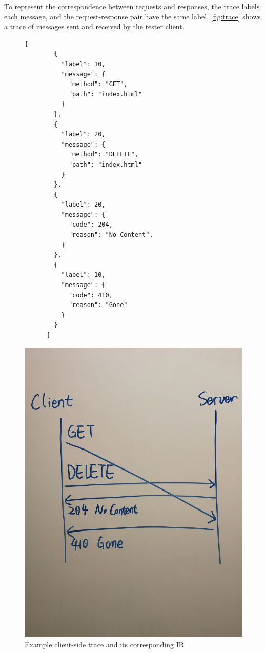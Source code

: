 To represent the correspondence between requests and responses, the trace labels
each message, and the request-response pair have the same label.
\autoref{fig:trace} shows a trace of messages sent and received by the tester
client.

\begin{figure}
  \begin{minipage}{.5\textwidth}
    \begin{lstlisting}[style=json]
      [
        {
          "label": 10,
          "message": {
            "method": "GET",
            "path": "index.html"
          }
        },
        {
          "label": 20,
          "message": {
            "method": "DELETE",
            "path": "index.html"
          }
        },
        {
          "label": 20,
          "message": {
            "code": 204,
            "reason": "No Content",
          }
        },
        {
          "label": 10,
          "message": {
            "code": 410,
            "reason": "Gone"
          }
        }
      ]
    \end{lstlisting}
  \end{minipage}%
  \begin{minipage}{.5\textwidth}
    \includegraphics[width=\textwidth]{figures/trace}
  \end{minipage}
  \caption{Example client-side trace and its corresponding IR}
  \label{fig:trace}
\end{figure}

